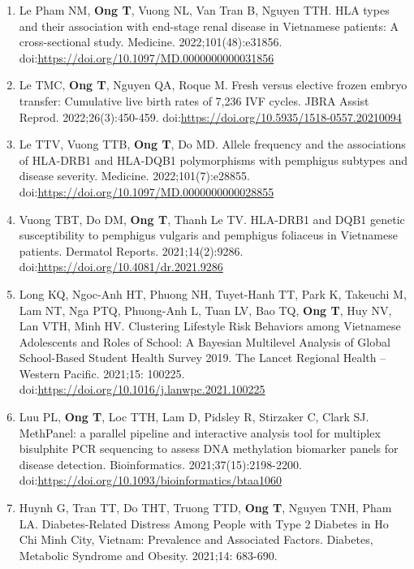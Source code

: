 \documentclass[
  12pt,
  a4paper,
]{article}
\begin{document}
\begin{enumerate}
  in women presenting low progesterone levels on the day of frozen
  embryo transfer: a randomised controlled trial. BMJ Open.
  2022;12(2):e057353.
  doi:\url{https://doi.org/10.1136/bmjopen-2021-057353}
\item
  Le Pham NM, \textbf{Ong T}, Vuong NL, Van Tran B, Nguyen TTH. HLA
  types and their association with end-stage renal disease in Vietnamese
  patients: A cross-sectional study. Medicine. 2022;101(48):e31856.
  doi:\url{https://doi.org/10.1097/MD.0000000000031856}
\item
  Le TMC, \textbf{Ong T}, Nguyen QA, Roque M. Fresh versus elective
  frozen embryo transfer: Cumulative live birth rates of 7,236 IVF
  cycles. JBRA Assist Reprod. 2022;26(3):450-459.
  doi:\url{https://doi.org/10.5935/1518-0557.20210094}
\item
  Le TTV, Vuong TTB, \textbf{Ong T}, Do MD. Allele frequency and the
  associations of HLA-DRB1 and HLA-DQB1 polymorphisms with pemphigus
  subtypes and disease severity. Medicine. 2022;101(7):e28855.
  doi:\url{https://doi.org/10.1097/MD.0000000000028855}
\item
  Vuong TBT, Do DM, \textbf{Ong T}, Thanh Le TV. HLA-DRB1 and DQB1
  genetic susceptibility to pemphigus vulgaris and pemphigus foliaceus
  in Vietnamese patients. Dermatol Reports. 2021;14(2):9286.
  doi:\url{https://doi.org/10.4081/dr.2021.9286}
\item
  Long KQ, Ngoc-Anh HT, Phuong NH, Tuyet-Hanh TT, Park K, Takeuchi M,
  Lam NT, Nga PTQ, Phuong-Anh L, Tuan LV, Bao TQ, \textbf{Ong T}, Huy
  NV, Lan VTH, Minh HV. Clustering Lifestyle Risk Behaviors among
  Vietnamese Adolescents and Roles of School: A Bayesian Multilevel
  Analysis of Global School-Based Student Health Survey 2019. The Lancet
  Regional Health -- Western Pacific. 2021;15: 100225.
  doi:\url{https://doi.org/10.1016/j.lanwpc.2021.100225}
\item
  Luu PL, \textbf{Ong T}, Loc TTH, Lam D, Pidsley R, Stirzaker C, Clark
  SJ. MethPanel: a parallel pipeline and interactive analysis tool for
  multiplex bisulphite PCR sequencing to assess DNA methylation
  biomarker panels for disease detection. Bioinformatics.
  2021;37(15):2198-2200.
  doi:\url{https://doi.org/10.1093/bioinformatics/btaa1060}
\item
  Huynh G, Tran TT, Do THT, Truong TTD, \textbf{Ong T}, Nguyen TNH, Pham
  LA. Diabetes-Related Distress Among People with Type 2 Diabetes in Ho
  Chi Minh City, Vietnam: Prevalence and Associated Factors. Diabetes,
  Metabolic Syndrome and Obesity. 2021;14: 683-690.

\end{enumerate}
\end{document}
